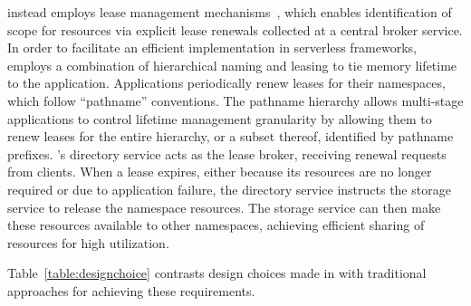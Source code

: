 {\jiffy instead employs lease management mechanisms~\cite{gray1989leases, chubby, dhcplease}, which enables identification of scope for resources via explicit lease renewals collected at a central broker service.  In order to facilitate an efficient implementation in serverless frameworks, \jiffy employs a combination of hierarchical naming and leasing to tie memory lifetime to the application. Applications periodically renew leases for their namespaces, which follow ``pathname'' conventions. The pathname hierarchy allows multi-stage applications to control lifetime management granularity by allowing them to renew leases for the entire hierarchy, or a subset thereof, identified by pathname prefixes. \jiffy's directory service acts as the lease broker, receiving renewal requests from \jiffy clients. When a lease expires, either because its resources are no longer required or due to application failure, the directory service instructs the storage service to release the namespace resources. The storage service can then make these resources available to other namespaces, achieving efficient sharing of resources for high utilization.

Table~\ref{table:designchoice} contrasts design choices made in \jiffy with traditional approaches for achieving these requirements.}


